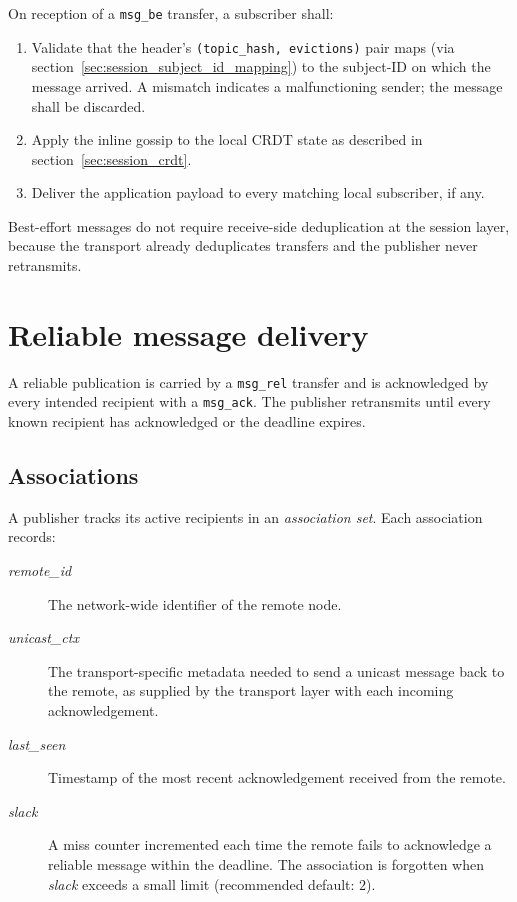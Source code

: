 On reception of a \texttt{msg\_be} transfer, a subscriber shall:

\begin{enumerate}
    \item Validate that the header's \texttt{(topic\_hash, evictions)} pair
    maps (via section~\ref{sec:session_subject_id_mapping}) to the subject-ID
    on which the message arrived. A mismatch indicates a malfunctioning
    sender; the message shall be discarded.
    \item Apply the inline gossip to the local CRDT state as described in
    section~\ref{sec:session_crdt}.
    \item Deliver the application payload to every matching local subscriber,
    if any.
\end{enumerate}

Best-effort messages do not require receive-side deduplication at the session
layer, because the transport already deduplicates transfers and the publisher
never retransmits.

\section{Reliable message delivery}\label{sec:session_reliable}

A reliable publication is carried by a \texttt{msg\_rel} transfer and is
acknowledged by every intended recipient with a \texttt{msg\_ack}. The
publisher retransmits until every known recipient has acknowledged or the
deadline expires.

\subsection{Associations}

A publisher tracks its active recipients in an \emph{association set}. Each
association records:

\begin{description}
    \item[\textit{remote\_id}] The network-wide identifier of the remote node.
    \item[\textit{unicast\_ctx}] The transport-specific metadata needed to send
    a unicast message back to the remote, as supplied by the transport layer
    with each incoming acknowledgement.
    \item[\textit{last\_seen}] Timestamp of the most recent acknowledgement
    received from the remote.
    \item[\textit{slack}] A miss counter incremented each time the remote
    fails to acknowledge a reliable message within the deadline. The
    association is forgotten when \textit{slack} exceeds a small limit
    (recommended default: $2$).
\end{description}

